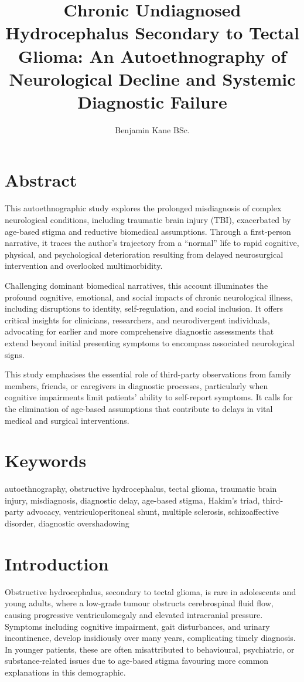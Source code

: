 \documentclass{article}
\title{Chronic Undiagnosed Hydrocephalus Secondary to Tectal Glioma: An Autoethnography of Neurological Decline and Systemic Diagnostic Failure}
\author{Benjamin Kane BSc.}
\begin{document}
\maketitle

\section{Abstract}
\noindent This autoethnographic study explores the prolonged misdiagnosis of complex neurological conditions, including traumatic brain injury (TBI), exacerbated by age-based stigma and reductive biomedical assumptions. Through a first-person narrative, it traces the author’s trajectory from a “normal” life to rapid cognitive, physical, and psychological deterioration resulting from delayed neurosurgical intervention and overlooked multimorbidity.

Challenging dominant biomedical narratives, this account illuminates the profound cognitive, emotional, and social impacts of chronic neurological illness, including disruptions to identity, self-regulation, and social inclusion. It offers critical insights for clinicians, researchers, and neurodivergent individuals, advocating for earlier and more comprehensive diagnostic assessments that extend beyond initial presenting symptoms to encompass associated neurological signs.

This study emphasises the essential role of third-party observations from family members, friends, or caregivers in diagnostic processes, particularly when cognitive impairments limit patients’ ability to self-report symptoms. It calls for the elimination of age-based assumptions that contribute to delays in vital medical and surgical interventions.

\section*{Keywords}
\noindent
autoethnography, obstructive hydrocephalus, tectal glioma, traumatic brain injury, misdiagnosis, diagnostic delay, age-based stigma, Hakim’s triad, third-party advocacy, ventriculoperitoneal shunt, multiple sclerosis, schizoaffective disorder, diagnostic overshadowing

\section*{Introduction}
Obstructive hydrocephalus, secondary to tectal glioma, is rare in adolescents and young adults, where a low-grade tumour obstructs cerebrospinal fluid flow, causing progressive ventriculomegaly and elevated intracranial pressure. Symptoms including cognitive impairment, gait disturbances, and urinary incontinence, develop insidiously over many years, complicating timely diagnosis. In younger patients, these are often misattributed to behavioural, psychiatric, or substance-related issues due to age-based stigma favouring more common explanations in this demographic.
\end{document}
